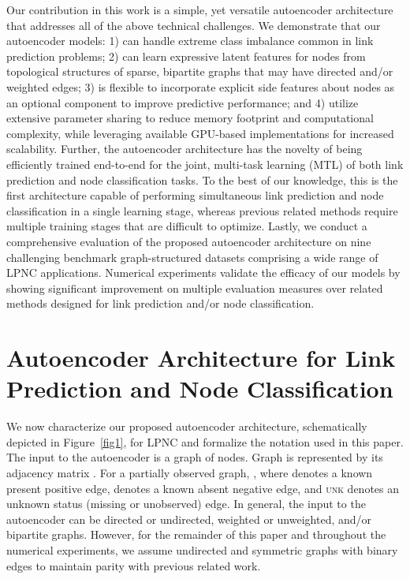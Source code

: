 \documentclass[letterpaper, conference]{IEEEtran}
\begin{document}
Our contribution in this work is a simple, yet versatile autoencoder architecture that addresses all of the above technical challenges. We demonstrate that our autoencoder models: 1) can handle extreme class imbalance common in link prediction problems; 2) can learn expressive latent features for nodes from topological structures of sparse, bipartite graphs that may have directed and/or weighted edges; 3) is flexible to incorporate explicit side features about nodes as an optional component to improve predictive performance; and 4) utilize extensive parameter sharing to reduce memory footprint and computational complexity, while leveraging available GPU-based implementations for increased scalability. Further, the autoencoder architecture has the novelty of being efficiently trained end-to-end for the joint, multi-task learning (MTL) of both link prediction and node classification tasks. To the best of our knowledge, this is the first architecture capable of performing simultaneous link prediction and node classification in a single learning stage, whereas previous related methods require multiple training stages that are difficult to optimize. Lastly, we conduct a comprehensive evaluation of the proposed autoencoder architecture on nine challenging benchmark graph-structured datasets comprising a wide range of LPNC applications. Numerical experiments validate the efficacy of our models by showing significant improvement on multiple evaluation measures over related methods designed for link prediction and/or node classification.

\section{Autoencoder Architecture for Link Prediction and Node Classification}

We now characterize our proposed autoencoder architecture, schematically depicted in Figure~\ref{fig1}, for LPNC and formalize the notation used in this paper. The input to the autoencoder is a graph  of  nodes. Graph  is represented by its adjacency matrix . For a partially observed graph, , where  denotes a known present positive edge,  denotes a known absent negative edge, and \textsc{unk} denotes an unknown status (missing or unobserved) edge. In general, the input to the autoencoder can be directed or undirected, weighted or unweighted, and/or bipartite graphs. However, for the remainder of this paper and throughout the numerical experiments, we assume undirected and symmetric graphs with binary edges to maintain parity with previous related work.
\end{document}
